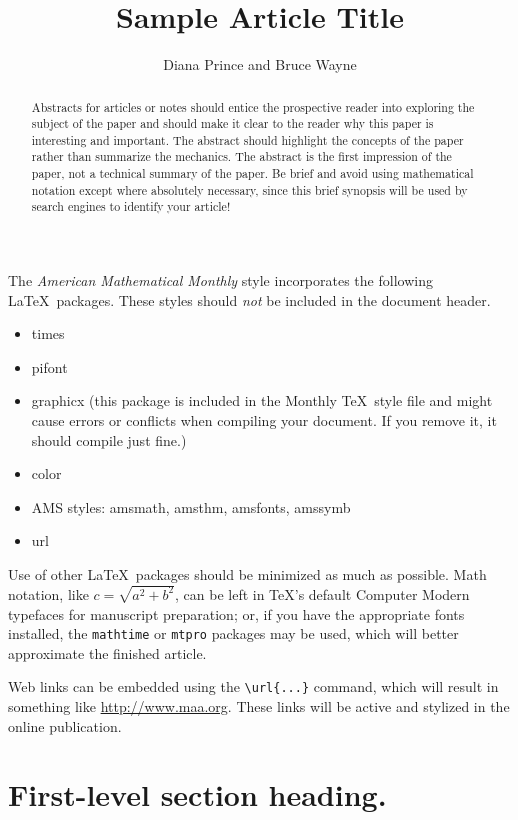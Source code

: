 \documentclass{article}
\theoremstyle{theorem}
\theoremstyle{definition}
\begin{document}
\title{Sample Article Title}
\author{Diana Prince and Bruce Wayne}

\maketitle


\begin{abstract}
Abstracts for articles or notes should entice the prospective reader into exploring the subject of the paper and should make it clear to the reader why this paper is interesting and important.  The abstract should highlight the concepts of the paper rather than summarize the mechanics.  The abstract is the first impression of the paper, not a technical summary of the paper. Be brief and avoid using mathematical notation except where absolutely necessary, since this brief synopsis will be used by search engines to identify your article!
\end{abstract}


\noindent
The \textit{American Mathematical Monthly} style incorporates the following \LaTeX\ packages.  These styles should \textit{not} be included in the document header.
\begin{itemize}
\item times
\item pifont
\item graphicx (this package is included in the {\sc Monthly} \TeX\ style file and might cause errors or conflicts when compiling your document.  If you remove it, it should compile just fine.)
\item color
\item AMS styles: amsmath, amsthm, amsfonts, amssymb
\item url
\end{itemize}
Use of other \LaTeX\ packages should be minimized as much as possible. Math notation, like $c = \sqrt{a^2 +b^2}$, can be left in \TeX's default Computer Modern typefaces for manuscript preparation; or, if you have the appropriate fonts installed, the \texttt{mathtime} or \texttt{mtpro} packages may be used, which will better approximate the finished article.

Web links can be embedded using the \verb~\url{...}~ command, which will result in something like \url{http://www.maa.org}.  These links will be active and stylized in the online publication.

\section{First-level section heading.}
\end{document}
